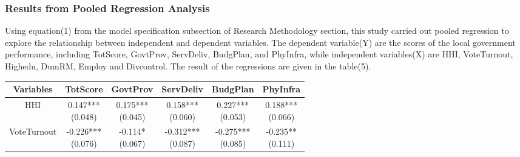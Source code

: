 \subsubsection{Results from Pooled Regression Analysis}
Using  equation(1) from the model specification subsection of Research Methodology section, this study carried out pooled regression to explore the relationship between independent and dependent variables. The dependent variable(Y) are the scores of the local government performance, including TotScore, GovtProv, ServDeliv, BudgPlan, and PhyInfra,  while independent variables(X) are HHI, VoteTurnout, Highedu, DumRM, Employ and Divcontrol. The result of the regressions are given in the table(5).\\
\begin{table}[ht]
\centering
\begin{tabular}{|cccccc|}
\hline
\textbf{Variables} & \textbf{TotScore} & \textbf{GovtProv} & \textbf{ServDeliv} & \textbf{BudgPlan} & \textbf{PhyInfra} \\
\hline
HHI & \makecell{0.147*** \\ (0.048)} & \makecell{0.175*** \\ (0.045)} & \makecell{0.158***\\ (0.060)} & \makecell{0.227*** \\ (0.053)} & \makecell{0.188*** \\ (0.066)} \\

VoteTurnout& \makecell{-0.226*** \\ (0.076)} & \makecell{-0.114* \\ (0.067)} & \makecell{-0.312***\\ (0.087)} & \makecell{-0.275*** \\ (0.085)}& \makecell{-0.235** \\ (0.111)} \\


\end{tabular}
\end{table}
